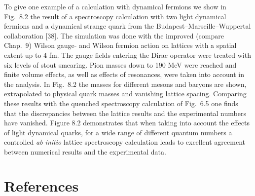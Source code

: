 To give one example of a calculation with dynamical fermions we show in
Fig.~8.2 the result of a spectroscopy calculation with two light dynamical
fermions and a dynamical strange quark from the Budapest--Marseille--Wuppertal
collaboration [38]. The simulation was done with the improved (compare
Chap.~9) Wilson gauge- and Wilson fermion action on lattices with a spatial
extent up to 4 fm. The gauge fields entering the Dirac operator were treated
with six levels of stout smearing. Pion masses down to 190 MeV were reached and
finite volume effects, as well as effects of resonances, were taken into
account in the analysis. In Fig.~8.2 the masses for different mesons and
baryons are shown, extrapolated to physical quark masses and vanishing lattice
spacing.
Comparing these results with the quenched spectroscopy calculation of Fig.~6.5
one finds that the discrepancies between the lattice results and the
experimental numbers have vanished. Figure 8.2 demonstrates that when taking
into account the effects of light dynamical quarks, for a wide range of
different quantum numbers a controlled \emph{ab initio} lattice spectroscopy
calculation leads to excellent agreement between numerical results and the
experimental data.

\section*{References}

